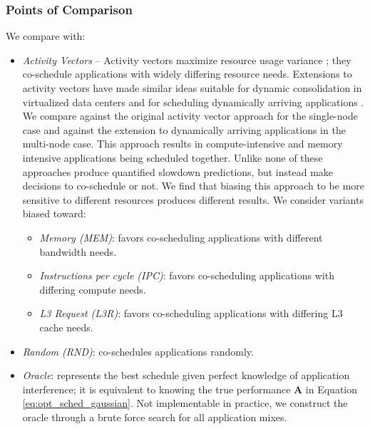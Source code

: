 \subsubsection{Points of Comparison}
\label{sec:expt:poc}
We compare \SYSTEM{} with:
\begin{itemize}
\item \textit{Activity Vectors} -- Activity vectors maximize resource
  usage variance \cite{merkel2010resource}; \ie they co-schedule
  applications with widely differing resource needs.  Extensions to
  activity vectors have made similar ideas suitable for dynamic
  consolidation in virtualized data centers \cite{Merlin} and for
  scheduling dynamically arriving applications \cite{resense}.  We
  compare against the original activity vector approach for the
  single-node case and against the extension to dynamically arriving
  applications in the multi-node case.  This approach results in
  compute-intensive and memory intensive applications being scheduled
  together.  Unlike \SYSTEM{} none of these approaches produce
  quantified slowdown predictions, but instead make decisions to
  co-schedule or not. We find that biasing this approach to be more
  sensitive to different resources produces different results.  We
  consider variants biased toward:
  \begin{itemize}
  \item \textit{Memory (MEM)}: favors co-scheduling applications with
    different bandwidth needs.
  \item \textit{Instructions per cycle (IPC)}: favors co-scheduling
    applications with differing compute needs.
  \item \textit{L3 Request (L3R)}: favors co-scheduling applications
    with differing L3 cache needs.
  \end{itemize}
\item \textit{Random (RND)}: co-schedules applications randomly.
\item \textit{Oracle}: represents the best schedule given perfect
  knowledge of application interference; \ie it is equivalent to
  knowing the true performance $\mathbf{A}$ in Equation
  \eqref{eq:opt_sched_gaussian}.  Not implementable in practice, we
  construct the oracle through a brute force search for all
  application mixes.
\end{itemize}

